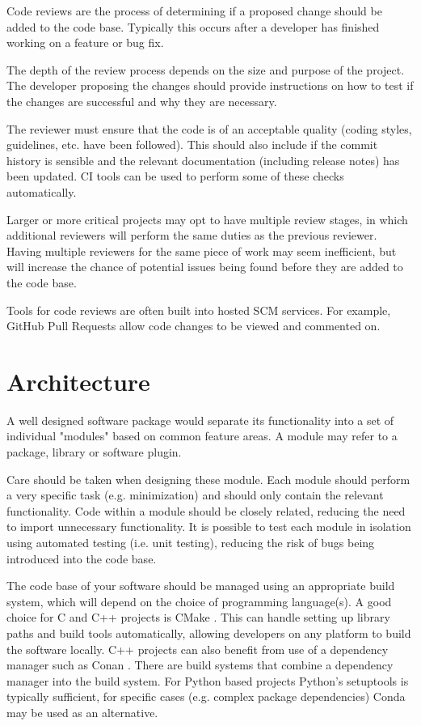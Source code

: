 \documentclass[jnr]{iosart2x}
\begin{document}
\begin{itemzie}
Code reviews  are the process of determining if a proposed change should be added to the code base.
Typically this occurs after a developer has finished working on a feature or bug fix.

The depth of the review process depends on the size and purpose of the project.
The developer proposing the changes should provide instructions on how to test if the changes are successful and why they are necessary.

The reviewer must ensure that the code is of an acceptable quality (coding styles, guidelines, etc. have been followed).
This should also include if the commit history is sensible and the relevant documentation (including release notes) has been updated.
CI tools can be used to perform some of these checks automatically.

Larger or more critical projects may opt to have multiple review stages, in which additional reviewers will perform the same duties as the previous reviewer.
Having multiple reviewers for the same piece of work may seem inefficient, but will increase the chance of potential issues being found before they are added to the code base.

Tools for code reviews are often built into hosted SCM services.
For example, GitHub Pull Requests allow code changes to be viewed and commented on.

\section{Architecture}
\label{Architecture}

A well designed software package would separate its functionality into a set of individual "modules" based on common feature areas.
A module may refer to a package, library or software plugin.

Care should be taken when designing these module.
Each module should perform a very specific task (e.g. minimization) and should only contain the relevant functionality.
Code within a module should be closely related, reducing the need to import unnecessary functionality.
It is possible to test each module in isolation using automated testing (i.e. unit testing), reducing the risk of bugs being introduced into the code base.

The code base of your software should be managed using an appropriate build system, which will depend on the choice of programming language(s).
A good choice for C and C++ projects is CMake \cite{CMake}.
This can handle setting up library paths and build tools automatically, allowing developers on any platform to build the software locally.
C++ projects can also benefit from use of a dependency manager such as Conan \cite{Conan}.
There are build systems that combine a dependency manager into the build system.
For Python based projects Python's setuptools is typically sufficient, for specific cases (e.g. complex package dependencies) Conda may be used as an alternative.


\end{itemzie}
\end{document}
